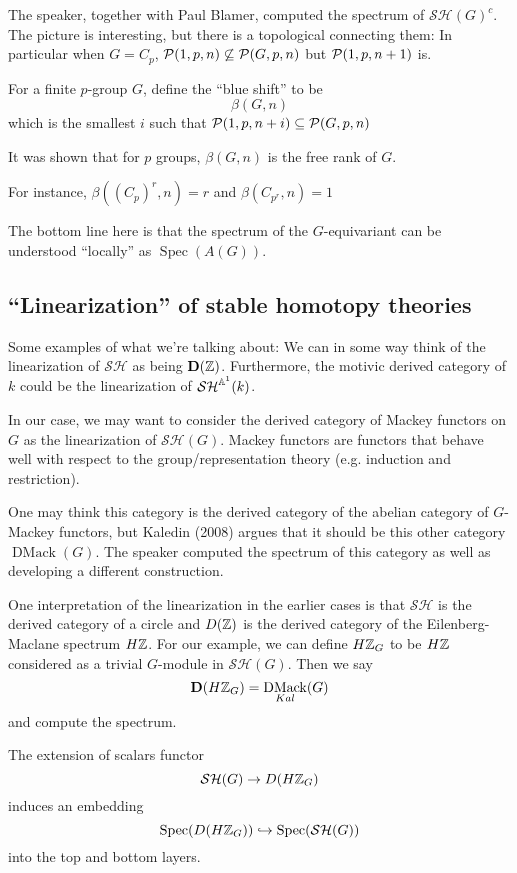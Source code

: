 \documentclass[12pt]{article}
\DeclareMathOperator{\Spec}{Spec}
\newcommand{\SH}{\mathcal{SH}}
\DeclareMathOperator{\DMack}{DMack}
\begin{document}
The speaker, together with Paul Blamer, computed the spectrum of $\SH(G)^c$. The picture is interesting, but there is a topological connecting
them: In particular when $G=C_p$, $\mathcal{P}(1,p,n)\not\subseteq \mathcal{P}(G,p,n)$ but $\mathcal{P}(1,p,n+1)$ is.

\begin{defn}
	For a finite $p$-group $G$, define the ``blue shift'' to be 
	\[\beta(G,n)\]
	which is the smallest $i$ such that $\mathcal{P}(1,p,n+i)\subseteq\mathcal{P}(G,p,n)$
\end{defn}
It was shown that for $p$ groups, $\beta(G,n)$ is the free rank of $G$.
\begin{rmk}
	For instance, $\beta((C_p)^r,n)=r$ and $\beta(C_{p^r},n)=1$
\end{rmk}

The bottom line here is that the spectrum of the $G$-equivariant can be understood ``locally''
as $\Spec(A(G))$.

\subsection{``Linearization'' of stable homotopy theories}
Some examples of what we're talking about: We can in some way think of the linearization of $\SH$ as being $\mathbf{D}(\mathbb{Z})$.
Furthermore, the motivic derived category of $k$ could be the linearization of $\SH^{\bbA^1}(k)$.

In our case, we may want to consider the derived category of Mackey functors on $G$ as the linearization of $\SH(G)$. Mackey functors 
are functors that behave well with respect to the group/representation theory (e.g. induction and restriction).

One may think this category is the derived category of the abelian category of $G$-Mackey functors, but 
Kaledin (2008) argues that it should be this other category $\DMack(G)$. The speaker computed the spectrum of this 
category as well as developing a different construction.

One interpretation of the linearization in the earlier cases is that $\SH$ is the derived category of a circle 
and $D(\mathbb{Z})$ is the derived category of the Eilenberg-Maclane spectrum $H\mathbb{Z}$. For our example, we can define 
$H\mathbb{Z}_G$ to be $H\mathbb{Z}$ considered as a trivial $G$-module in $\SH(G)$. Then we say 
\[\D(H\bbZ_G)=\DMack_{Kal}(G)\]
and compute the spectrum.

\begin{thm}
	The extension of scalars functor 
	\[\SH(G)\to D(H\bbZ_G)\]
	induces an embedding 
	\[\Spec(D(H\bbZ_G))\hookrightarrow \Spec(\SH(G))\]
	into the top and bottom layers. 
\end{thm}
\end{document}
